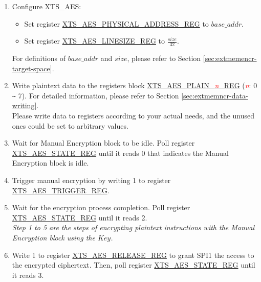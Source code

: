 \documentclass[main\_\_EN.tex]{subfiles}
\begin{document}
\begin{enumerate}

    \item Configure XTS\_AES:
    \begin{itemize}
        \item Set register \hyperref[regdesc:XTSAESPHYSICALADDRESSREG]{XTS\_AES\_PHYSICAL\_ADDRESS\_REG} to \begin{math}base\_addr\end{math}.
        \item Set register \hyperref[regdesc:XTSAESLINESIZEREG]{XTS\_AES\_LINESIZE\_REG} to \begin{math}\frac{size}{32}\end{math}.
    \end{itemize}
    For definitions of \begin{math} base\_addr\end{math} and \begin{math}size\end{math}, please refer to Section \ref{sec:extmemencr-target-space}.
    \item Write plaintext data to the registers block \hyperref[regdesc:XTSAESPLAINNREG]{XTS\_AES\_PLAIN\_\textcolor{red}{\it{n}}\_REG} (\textcolor{red}{\it{n}}: 0 \verb+~+ 7). For detailed information, please refer to Section \ref{sec:extmemncr-data-writing}. \\Please write data to registers according to your actual needs, and the unused ones could be set to arbitrary values.

    \item Wait for Manual Encryption block to be idle. Poll register \hyperref[regdesc:XTSAESSTATEREG]{XTS\_AES\_STATE\_REG} until it reads 0 that indicates the Manual Encryption block is idle.

    \item Trigger manual encryption by writing 1 to register \hyperref[regdesc:XTSAESTRIGGERREG]{XTS\_AES\_TRIGGER\_REG}.

    \item Wait for the encryption process completion. Poll register \hyperref[regdesc:XTSAESSTATEREG]{XTS\_AES\_STATE\_REG} until it reads 2. \\ \textit{Step 1 to 5 are the steps of encrypting plaintext instructions with the Manual Encryption block using the \begin{math}Key\end{math}.}

    \item Write 1 to register \hyperref[regdesc:XTSAESRELEASEREG]{XTS\_AES\_RELEASE\_REG} to grant SPI1 the access to the encrypted ciphertext. Then, poll register \hyperref[regdesc:XTSAESSTATEREG]{XTS\_AES\_STATE\_REG} until it reads 3.


\end{enumerate}
\end{document}
